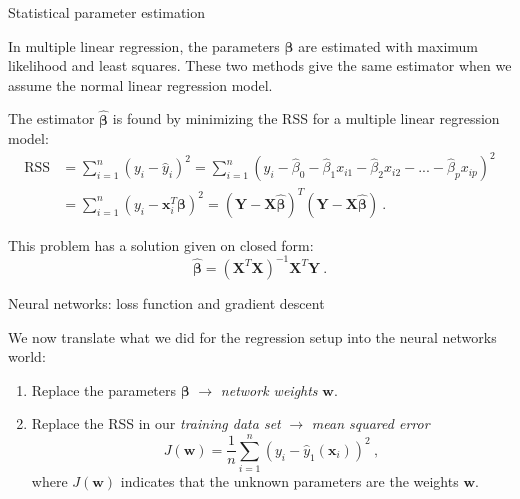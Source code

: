 \documentclass[10pt,ignorenonframetext,]{beamer}
\begin{document}
\begin{frame}

\begin{block}{Statistical parameter estimation}

\vspace{2mm}

In multiple linear regression, the parameters \(\boldsymbol\beta\) are
estimated with maximum likelihood and least squares. These two methods
give the same estimator when we assume the normal linear regression
model.

The estimator \(\hat{\boldsymbol \beta}\) is found by minimizing the RSS
for a multiple linear regression model:
\[\begin{aligned} \text{RSS} &=\sum_{i=1}^n (y_i - \hat y_i)^2 = \sum_{i=1}^n (y_i - \hat \beta_0 - \hat \beta_1 x_{i1} - \hat \beta_2 x_{i2} -...-\hat \beta_p x_{ip} )^2 \\
&= \sum_{i=1}^n (y_i-{\boldsymbol x}_i^T \boldsymbol \beta)^2=({\boldsymbol Y}-{\boldsymbol X}\hat{\boldsymbol{\beta}})^T({\boldsymbol Y}-{\boldsymbol X}\hat{\boldsymbol{\beta}}) \ .\end{aligned}\]

This problem has a solution given on closed form:
\[ \hat{\boldsymbol\beta}=({\boldsymbol X}^T{\boldsymbol X})^{-1} {\boldsymbol X}^T {\boldsymbol Y} \ .\]

\end{block}

\end{frame}

\begin{frame}

\begin{block}{Neural networks: loss function and gradient descent}

\vspace{4mm}

We now translate what we did for the regression setup into the neural
networks world: \vspace{2mm}

\begin{enumerate}
\def\labelenumi{\arabic{enumi}.}
\item
  Replace the parameters \(\boldsymbol\beta\) \(\rightarrow\)
  \emph{network weights} \(\boldsymbol w\).
\item
  Replace the RSS in our \emph{training data set} \(\rightarrow\)
  \emph{mean squared error}
  \[ J({\boldsymbol w})=\frac{1}{n}\sum_{i=1}^n (y_i-{\hat{y}_1({\boldsymbol x}_i)})^2 \ ,\]
  where \(J({\boldsymbol w})\) indicates that the unknown parameters are
  the weights \({\boldsymbol w}\).
\end{enumerate}

\end{block}

\end{frame}
\end{document}
